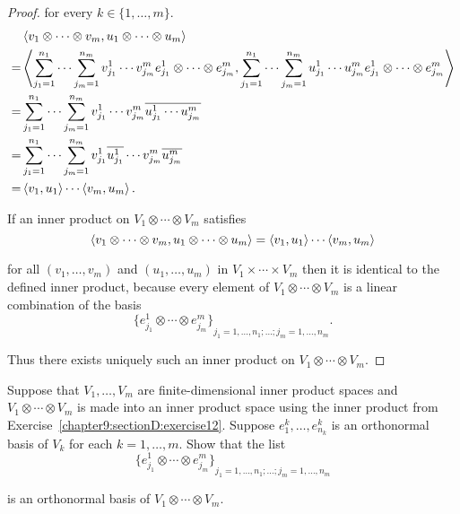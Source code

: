 \begin{proof}
    for every $k\in\{1,\ldots,m\}$.
    \begin{align*}
          & \left\langle{v_{1}\otimes\cdots\otimes v_{m}, u_{1}\otimes\cdots\otimes u_{m}}\right\rangle                                                                                                                                                                                                         \\
        = & \left\langle{\sum^{n_{1}}_{j_{1}=1}\cdots\sum^{n_{m}}_{j_{m}=1}v_{j_{1}}^{1}\cdots v_{j_{m}}^{m}e_{j_{1}}^{1}\otimes \cdots\otimes e_{j_{m}}^{m}, \sum^{n_{1}}_{j_{1}=1}\cdots\sum^{n_{m}}_{j_{m}=1}u_{j_{1}}^{1}\cdots u_{j_{m}}^{m}e_{j_{1}}^{1}\otimes \cdots\otimes e_{j_{m}}^{m}}\right\rangle \\
        = & \sum^{n_{1}}_{j_{1}=1}\cdots\sum^{n_{m}}_{j_{m}=1}v_{j_{1}}^{1}\cdots v_{j_{m}}^{m}\overline{u_{j_{1}}^{1}\cdots u_{j_{m}}^{m}}                                                                                                                                                          \\
        = & \sum^{n_{1}}_{j_{1}=1}\cdots\sum^{n_{m}}_{j_{m}=1}v_{j_{1}}^{1}\overline{u_{j_{1}}^{1}}\cdots v_{j_{m}}^{m}\overline{u_{j_{m}}^{m}}                                                                                                                                                          \\
        = & \left\langle{v_{1}, u_{1}}\right\rangle\cdots\left\langle{v_{m}, u_{m}}\right\rangle.
    \end{align*}

    If an inner product on $V_{1}\otimes \cdots \otimes V_{m}$ satisfies
    \[
        \left\langle{v_{1}\otimes \cdots\otimes v_{m}, u_{1}\otimes \cdots\otimes u_{m}}\right\rangle = \left\langle{v_{1}, u_{1}}\right\rangle\cdots\left\langle{v_{m}, u_{m}}\right\rangle
    \]

    for all $(v_{1}, \ldots, v_{m})$ and $(u_{1}, \ldots, u_{m})$ in $V_{1}\times\cdots\times V_{m}$ then it is identical to the defined inner product, because every element of $V_{1}\otimes \cdots \otimes V_{m}$ is a linear combination of the basis
    \[
        {\{ e_{j_{1}}^{1}\otimes \cdots \otimes e_{j_{m}}^{m} \}}_{j_{1}=1,\ldots,n_{1}; \ldots; j_{m}=1,\ldots,n_{m}}.
    \]

    Thus there exists uniquely such an inner product on $V_{1}\otimes \cdots\otimes V_{m}$.
\end{proof}
\newpage

\begin{exercise}\label{chapter9:sectionD:exercise13}
    Suppose that $V_{1}, \ldots, V_{m}$ are finite-dimensional inner product spaces and $V_{1}\otimes\cdots\otimes V_{m}$ is made into an inner product space using the inner product from Exercise~\ref{chapter9:sectionD:exercise12}. Suppose $e_{1}^{k}, \ldots, e_{n_{k}}^{k}$ is an orthonormal basis of $V_{k}$ for each $k = 1,\ldots,m$. Show that the list
    \[
        {\{ e_{j_{1}}^{1}\otimes \cdots\otimes e_{j_{m}}^{m} \}}_{j_{1}=1,\ldots,n_{1}; \ldots ; j_{m}=1,\ldots,n_{m}}
    \]

    is an orthonormal basis of $V_{1}\otimes\cdots\otimes V_{m}$.
\end{exercise}

